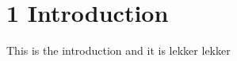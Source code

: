 \chapter*{1 Introduction}
\setcounter{chapter}{1}
\label{intro}
This is the introduction and it is lekker lekker